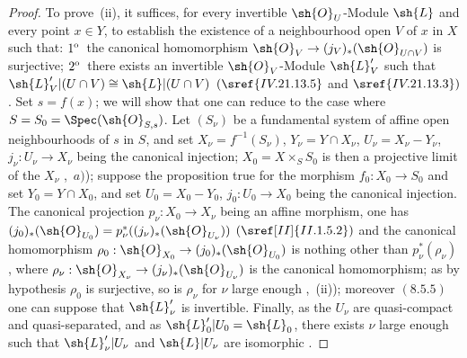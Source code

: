 \begin{proof}
To prove~(ii), it suffices, for every invertible $\sh{O}_U$-Module $\sh{L}$ and every point $x\in Y$, to establish the existence of a neighbourhood open $V$ of $x$ in $X$ such that: $1\textsuperscript{o}$~the canonical homomorphism $\sh{O}_V\to(j_V)_*(\sh{O}_{U\cap V})$ is surjective; $2\textsuperscript{o}$~there exists an invertible $\sh{O}_V$-Module $\sh{L}'_V$ such that $\sh{L}'_V|(U\cap V)\cong\sh{L}|(U\cap V)$ $(\sref{IV.21.13.5}$ and $\sref{IV.21.13.3})$.
Set $s=f(x)$; we will show that one can reduce to the case where $S=S_0=\Spec(\sh{O}_{S,s})$.
Let $(S_\nu)$ be a fundamental system of affine open neighbourhoods of $s$ in $S$, and set $X_\nu=f^{-1}(S_\nu)$, $Y_\nu=Y\cap X_\nu$, $U_\nu=X_\nu-Y_\nu$, $j_\nu:U_\nu\to X_\nu$ being the canonical injection; $X_0=X\times_SS_0$ is then a projective limit of the $X_\nu$ ,~$a)$); suppose the proposition true for the morphism $f_0:X_0\to S_0$ and set $Y_0=Y\cap X_0$, and set $U_0=X_0-Y_0$, $j_0:U_0\to X_0$ being the canonical injection.
The canonical projection $p_\nu:X_0\to X_\nu$ being an affine morphism, one has $(j_0)_*(\sh{O}_{U_0})=p_\nu^*((j_\nu)_*(\sh{O}_{U_\nu}))$ $(\sref[II]{II.1.5.2})$ and the canonical homomorphism $\rho_0:\sh{O}_{X_0}\to(j_0)_*(\sh{O}_{U_0})$ is nothing other than $p_\nu^*(\rho_\nu)$, where $\rho_\nu:\sh{O}_{X_\nu}\to(j_\nu)_*(\sh{O}_{U_\nu})$ is the canonical homomorphism; as by hypothesis $\rho_0$ is surjective, so is $\rho_\nu$ for $\nu$ large enough ,~(ii)); moreover $(8.5.5)$ one can suppose that $\sh{L}'_\nu$ is invertible.
Finally, as the $U_\nu$ are quasi-compact and quasi-separated, and as $\sh{L}'_0|U_0=\sh{L}_0$, there exists $\nu$ large enough such that $\sh{L}'_\nu|U_\nu$ and $\sh{L}|U_\nu$ are isomorphic .


\end{proof}
